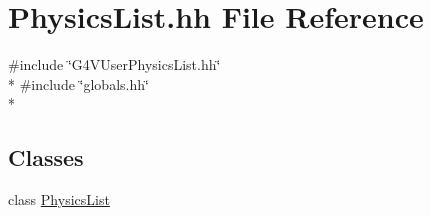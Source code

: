 \hypertarget{include_2_physics_list_8hh}{\section{Physics\-List.\-hh File Reference}
\label{include_2_physics_list_8hh}
}
{\ttfamily \#include \char`\"{}G4\-V\-User\-Physics\-List.\-hh\char`\"{}}\\*
{\ttfamily \#include \char`\"{}globals.\-hh\char`\"{}}\\*
\subsection*{Classes}
\begin{DoxyCompactItemize}
\item 
class \hyperlink{class_physics_list}{Physics\-List}
\end{DoxyCompactItemize}
